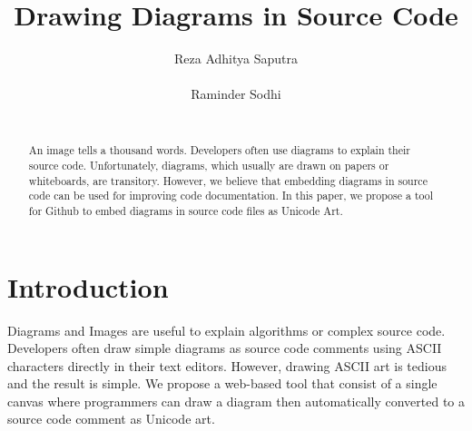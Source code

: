 \documentclass{sig-alternate}
\begin{document}
%

\title{Drawing Diagrams in Source Code
} 


\author{
\alignauthor
Reza Adhitya Saputra\\
       \\
\alignauthor
Raminder Sodhi\\
       \\
}


\maketitle
\begin{abstract}
An image tells a thousand words. Developers often use diagrams to explain their source code. Unfortunately, diagrams, which usually are drawn on papers or whiteboards, are transitory. However, we believe that embedding diagrams in source code can be used for improving code documentation. In this paper, we propose a tool for Github to embed diagrams in source code files as Unicode Art.
\end{abstract}

%


\section{Introduction}
Diagrams and Images are useful to explain algorithms or complex source code. Developers often draw simple diagrams as source code comments using ASCII characters directly in their text editors. However, drawing ASCII art is tedious and the result is simple. We propose a web-based tool that consist of a single canvas where programmers can draw a diagram then automatically converted to a source code comment as Unicode art.
\end{document}
